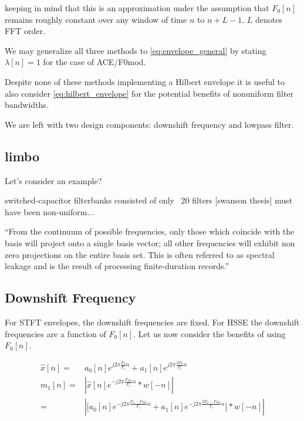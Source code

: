 \documentclass [11pt, proquest] {uwthesis}[2015/03/03]
\begin{document}
keeping in mind that this is an approximation under the assumption that $F_0[n]$ remains roughly constant over any window of time $n$ to $n + L - 1$.  $L$ denotes FFT order.

We may generalize all three methods to \ref{eq:envelope_general} by stating $\lambda[n] = 1$ for the case of ACE/F0mod.

Despite none of these methods implementing a Hilbert envelope it is useful to also consider \ref{eq:hilbert_envelope} for the potential benefits of nonuniform filter bandwidths.

We are left with two design components: downshift frequency and lowpass filter.

\subsection{limbo}

Let's consider an example?

switched-capacitor filterbanks consisted of only ~20 filters [swanson thesis] must have been non-uniform...



``From the continuum of possible frequencies, only those which coincide with the basis will project onto a single basis vector; all other frequencies will exhibit non zero projections on the entire basis set. This is often referred to as spectral leakage and is the result of processing finite-duration records.''

\subsection{Downshift Frequency}


For STFT envelopes, the downshift frequencies are fixed.  For HSSE the downshift frequencies are a function of $F_0[n]$.  Let us now consider the benefits of using $F_0[n]$.


\begin{align}
\widehat{x}[n] =& a_0[n] e^{j2\pi \frac{F_0}{F_s} n} + a_1[n] e^{j2\pi \frac{2F_0}{F_s} n} \\
m_1[n] =& | \widehat{x}[n] e^{-j2\pi \frac{F_{DS}}{F_s} n} * w[-n] | \\
=& | \Big[ a_0[n] e^{-j2\pi \frac{F_0 - F_{DS}}{F_s} n} + a_1[n] e^{-j2\pi \frac{2F_0 - F_{DS}}{F_s} n} \Big] * w[-n] | \\
\end{align}
\end{document}
